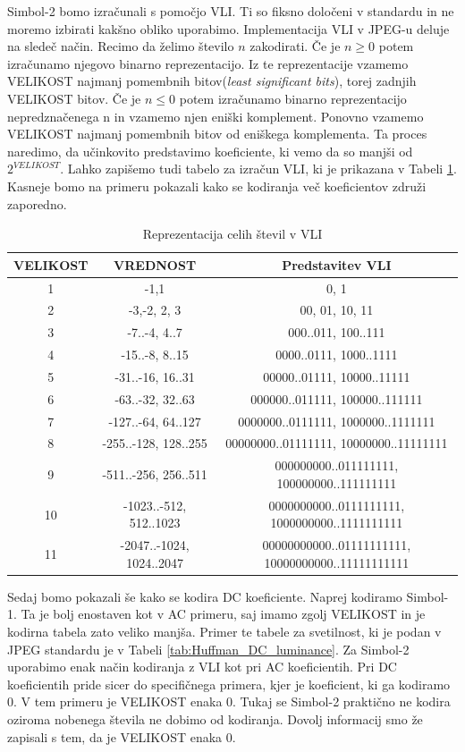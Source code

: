 \documentclass[a4paper,12pt,openright]{book}
\begin{document}
Simbol-2 bomo izračunali s pomočjo VLI. Ti so fiksno določeni v standardu in ne moremo izbirati kakšno obliko uporabimo. Implementacija VLI v JPEG-u deluje na sledeč način. Recimo da želimo število $n$ zakodirati. Če je $n \geq 0$ potem izračunamo njegovo binarno reprezentacijo. Iz te reprezentacije vzamemo VELIKOST najmanj pomembnih bitov(\textit{least significant bits}), torej zadnjih VELIKOST bitov. Če je $n \leq 0$ potem izračunamo binarno reprezentacijo nepredznačenega n in vzamemo njen eniški komplement. Ponovno vzamemo VELIKOST najmanj pomembnih bitov od eniškega komplementa. Ta proces naredimo, da učinkovito predstavimo koeficiente, ki vemo da so manjši od $2^{VELIKOST}$. Lahko zapišemo tudi tabelo za izračun VLI, ki je prikazana v Tabeli \ref{tab:VLI_tabela}. Kasneje bomo na primeru pokazali kako se kodiranja več koeficientov združi zaporedno.
\begin{table}[ht]
\centering
\begin{tabular}{|c|c|c|}
\hline
VELIKOST& VREDNOST& Predstavitev VLI\\
\hline
1  & -1,1 &0, 1\\
2  & -3,-2, 2, 3 &00, 01, 10, 11\\
3  & -7..-4, 4..7 &000..011, 100..111\\
4  & -15..-8, 8..15 &0000..0111, 1000..1111\\
5  & -31..-16, 16..31 &00000..01111, 10000..11111\\
6  & -63..-32, 32..63 &000000..011111, 100000..111111\\
7  & -127..-64, 64..127 &0000000..0111111, 1000000..1111111\\
8  & -255..-128, 128..255 &00000000..01111111, 10000000..11111111\\
9  & -511..-256, 256..511 &000000000..011111111, 100000000..111111111\\
10 & -1023..-512, 512..1023 &0000000000..0111111111, 1000000000..1111111111\\
11 & -2047..-1024, 1024..2047 &00000000000..01111111111, 10000000000..11111111111\\
\hline
\end{tabular}
\caption{Reprezentacija celih števil v VLI}
\label{tab:VLI_tabela}
\end{table}

Sedaj bomo pokazali še kako se kodira DC koeficiente. Naprej kodiramo Simbol-1. Ta je bolj enostaven kot v AC primeru, saj imamo zgolj VELIKOST in je kodirna tabela zato veliko manjša. Primer te tabele za svetilnost, ki je podan v JPEG standardu je v Tabeli \ref{tab:Huffman_DC_luminance}. Za Simbol-2 uporabimo enak način kodiranja z VLI kot pri AC koeficientih. Pri DC koeficientih pride sicer do specifičnega primera, kjer je koeficient, ki ga kodiramo 0. V tem primeru je VELIKOST enaka 0. Tukaj se Simbol-2 praktično ne kodira oziroma nobenega števila ne dobimo od kodiranja. Dovolj informacij smo že zapisali s tem, da je VELIKOST enaka 0. 
\end{document}
